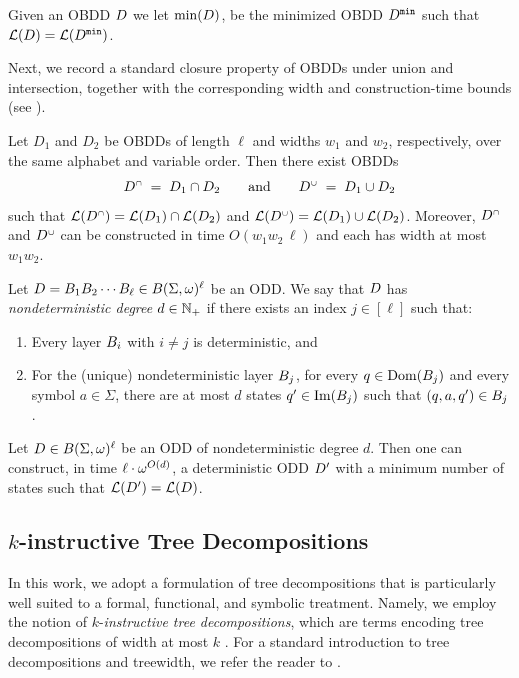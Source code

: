 Given an OBDD $D$ we let $\mathrm{min}(D)$, be the minimized OBDD $D^{\texttt{min}}$ such that $\mathcal{L}(D) = \mathcal{L}(D^{\texttt{min}})$.

Next, we record a standard closure property of OBDDs under union and intersection, together with the corresponding width and construction-time bounds (see \cite{bryant1986graph}).

\begin{lemma}\label{lem:obdd-union-intersection}
Let $D_1$ and $D_2$ be OBDDs of length $\ell$ and widths $w_1$ and $w_2$,
respectively, over the same alphabet and variable order. Then there exist OBDDs
\[
D^{{\scriptscriptstyle\cap}} \;=\; D_1 \cap D_2
\qquad\text{and}\qquad
D^{{\scriptscriptstyle\cup}} \;=\; D_1 \cup D_2
\]
such that $\mathcal{L}(D^{{\scriptscriptstyle\cap}})=\mathcal{L}(D_1)\cap\mathcal{L}(D_2)$ and
$\mathcal{L}(D^{{\scriptscriptstyle\cup}})=\mathcal{L}(D_1)\cup\mathcal{L}(D_2)$. Moreover,
$D^{{\scriptscriptstyle\cap}}$ and $D^{{\scriptscriptstyle\cup}}$ can be constructed in time
$O(w_1 w_2\,\ell)$ and each has width at most $w_1 w_2$.
\end{lemma}

Let $D = B_1B_2\cdots B_\ell \in B(\Sigma,\omega)^\ell$ be an ODD.
We say that $D$ has \emph{nondeterministic degree} $d\in\mathbb{N}_+$ if there exists
an index $j\in[\ell]$ such that:
\begin{enumerate}
    \item Every layer $B_i$ with $i\neq j$ is deterministic, and
    \item For the (unique) nondeterministic layer $B_j$, for every
    $q\in\mathrm{Dom}(B_j)$ and every symbol $a\in\Sigma$, there are at most $d$ states
    $q'\in\mathrm{Im}(B_j)$ such that $(q,a,q')\in B_j$.
\end{enumerate}


\begin{lemma}\label{lem:nondet-degree}
Let $D \in B(\Sigma,\omega)^\ell$ be an ODD of nondeterministic degree $d$.
Then one can construct, in time $\ell\cdot \omega^{O(d)}$, a deterministic ODD
$D'$ with a minimum number of states such that
$\mathcal{L}(D')=\mathcal{L}(D)$.
\end{lemma}




\subsection{$k$-instructive Tree Decompositions}  In this work, we adopt a formulation of tree decompositions that is particularly
well suited to a formal, functional, and symbolic treatment.
Namely, we employ the notion of $k$-\emph{instructive tree decompositions}, which are terms encoding tree decompositions of width at most $k$ \cite{From2023}. For a
standard introduction to tree decompositions and treewidth, we refer the reader
to \cite{BlueBook}.

